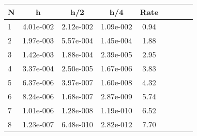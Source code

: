 \begin{tabular}{lcccccccc}
N & h & h/2 & h/4 & Rate\\
\hline
1& 4.01e-002& 2.12e-002& 1.09e-002& 0.94\\
2& 1.97e-003& 5.57e-004& 1.45e-004& 1.88\\
3& 1.42e-003& 1.88e-004& 2.39e-005& 2.95\\
4& 3.37e-004& 2.50e-005& 1.67e-006& 3.83\\
5& 6.37e-006& 3.97e-007& 1.60e-008& 4.32\\
6& 8.24e-006& 1.68e-007& 2.87e-009& 5.74\\
7& 1.01e-006& 1.28e-008& 1.19e-010& 6.52\\
8& 1.23e-007& 6.48e-010& 2.82e-012& 7.70\\
\hline
\end{tabular}
